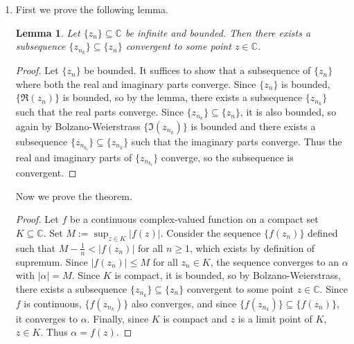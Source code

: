 \documentclass[11pt, letterpaper]{article}
\newtheorem{lemma}{Lemma}
\begin{document}
\thispagestyle{firststyle}


\begin{enumerate}
  \item First we prove the following lemma.
  \begin{lemma}
    Let $\lbrace z_n \rbrace \subseteq \mathbb C$ be infinite and bounded. Then there exists a subsequence $\lbrace z_{n_k} \rbrace \subseteq \lbrace z_n \rbrace$ convergent to some point $z \in \mathbb C$.
  \end{lemma}
  \begin{proof}
    Let $\lbrace z_n \rbrace$ be bounded. It suffices to show that a subsequence of $\lbrace z_n \rbrace$ where both the real and imaginary parts converge. Since $\lbrace z_n \rbrace$ is bounded, $\lbrace \Re(z_n) \rbrace$ is bounded, so by the lemma, there exists a subsequence $\lbrace z_{n_k} \rbrace$ such that the real parts converge. Since $\lbrace z_{n_k} \rbrace \subseteq \lbrace z_n \rbrace$, it is also bounded, so again by Bolzano-Weierstrass $\lbrace \Im(z_{n_k}) \rbrace$ is bounded and there exists a subsequence $\lbrace z_{n_{k_l}} \rbrace \subseteq \lbrace z_{n_k} \rbrace$ such that the imaginary parts converge. Thus the real and imaginary parts of $\lbrace z_{n_{k_l}} \rbrace$ converge, so the subsequence is convergent.
  \end{proof}

  Now we prove the theorem.
  
  \begin{proof}
    Let $f$ be a continuous complex-valued function on a compact set $K \subseteq \mathbb C$. Set $M := \sup_{z \in K} \vert f(z) \vert$. Consider the sequence $\lbrace f(z_n) \rbrace$ defined such that $M - \frac{1}{n} < \vert f(z_n) \vert$ for all $n \geq 1$, which exists by definition of supremum. Since $\vert f(z_n) \vert \leq M$ for all $z_n \in K$, the sequence converges to an $\alpha$ with $\vert \alpha \vert = M$. Since $K$ is compact, it is bounded, so by Bolzano-Weierstrass, there exists a subsequence $\lbrace z_{n_k} \rbrace \subseteq \lbrace z_n \rbrace$ convergent to some point $z \in \mathbb C$. Since $f$ is continuous, $\lbrace f(z_{n_k}) \rbrace$ also converges, and since $\lbrace f(z_{n_k}) \rbrace \subseteq \lbrace f(z_n) \rbrace$, it converges to $\alpha$. Finally, since $K$ is compact and $z$ is a limit point of $K$, $z \in K$. Thus $\alpha = f(z)$.


\end{proof}
\end{enumerate}
\end{document}
